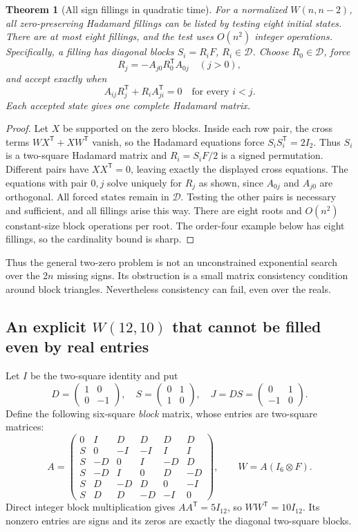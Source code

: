 \documentclass[11pt]{article}
\newtheorem{theorem}{Theorem}[section]
\begin{document}
\begin{theorem}[All sign fillings in quadratic time]
For a normalized $W(n,n-2)$, all zero-preserving Hadamard fillings
can be listed by testing eight initial states. There are at most
eight fillings, and the test uses $O(n^2)$ integer operations.
Specifically, a filling has diagonal blocks $S_i=R_iF$,
$R_i\in\mathcal D$. Choose $R_0\in\mathcal D$, force
\[
 R_j=-A_{j0}R_0^{\mathsf T}A_{0j}\quad(j>0),
\]
and accept exactly when
\[
 A_{ij}R_j^{\mathsf T}+R_iA_{ji}^{\mathsf T}=0
 \quad\text{for every }i<j.
\]
Each accepted state gives one complete Hadamard matrix.
\end{theorem}
\begin{proof}
Let $X$ be supported on the zero blocks. Inside each row pair,
the cross terms $WX^{\mathsf T}+XW^{\mathsf T}$ vanish, so the
Hadamard equations force $S_iS_i^{\mathsf T}=2I_2$. Thus $S_i$
is a two-square Hadamard matrix and $R_i=S_iF/2$ is a signed
permutation. Different pairs have $XX^{\mathsf T}=0$, leaving
exactly the displayed cross equations. The equations with pair
$0,j$ solve uniquely for $R_j$ as shown, since $A_{0j}$ and
$A_{j0}$ are orthogonal. All forced states remain in $\mathcal D$.
Testing the other pairs is necessary and sufficient, and all
fillings arise this way. There are eight roots and $O(n^2)$
constant-size block operations per root. The order-four example
below has eight fillings, so the cardinality bound is sharp.
\end{proof}

Thus the general two-zero problem is not an unconstrained
exponential search over the $2n$ missing signs. Its obstruction
is a small matrix consistency condition around block triangles.
Nevertheless consistency can fail, even over the reals.

\subsection{An explicit $W(12,10)$ that cannot be filled even by real entries}
Let $I$ be the two-square identity and put
\[
 D=\begin{pmatrix}1&0\\0&-1\end{pmatrix},\quad
 S=\begin{pmatrix}0&1\\1&0\end{pmatrix},\quad
 J=DS=\begin{pmatrix}0&1\\-1&0\end{pmatrix}.
\]
Define the following six-square \emph{block} matrix, whose entries
are two-square matrices:
\[
 A=\begin{pmatrix}
0&I&D&D&D&D\\
S&0&-I&-I&I&I\\
S&-D&0&I&-D&D\\
S&-D&I&0&D&-D\\
S&D&-D&D&0&-I\\
S&D&D&-D&-I&0
\end{pmatrix},\qquad W=A(I_6\otimes F).
\]
Direct integer block multiplication gives $AA^{\mathsf T}=5I_{12}$,
so $WW^{\mathsf T}=10I_{12}$. Its nonzero entries are signs and
its zeros are exactly the diagonal two-square blocks.
\end{document}
